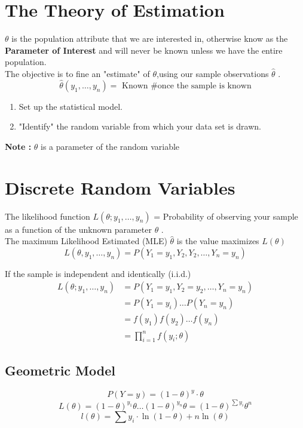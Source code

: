 \documentclass{article}
\begin{document}
\section{The Theory of Estimation}
\(\theta\) is the population attribute that we are interested in, otherwise know as the \textbf{Parameter of Interest} and will never be known unless we have the entire population.\\

The objective is to fine an "estimate" of \(\theta\),using our sample observations \(\hat{\theta}\) .
$$ \hat{\theta} (y_1, \ldots, y_n) = \text{ Known \# once the sample is known} $$ 

\begin{enumerate}
\item Set up the statistical model. 
\item "Identify" the random variable from which your data set is drawn. 
\end{enumerate} 

\textbf{Note : } \(\theta\) is a parameter of the random variable

\section{Discrete Random Variables}
The likelihood function \(L(\theta ; y_1, \ldots, y_n)\) = Probability of observing your sample as a function of the unknown parameter \(\theta\) . \\

The maximum Likelihood Estimated (MLE) \(\hat{\theta}\) is the value maximizes \(L(\theta)\)
$$ L(\theta, y_1, \ldots, y_n) = P(Y_1 = y_1, Y_2, Y_2, \ldots, Y_n = y_n)$$

If the sample is independent and identically  (i.i.d.) 
$$ \begin{aligned}
L(\theta; y_1, \ldots, y_n) & = P(Y_1 = y_1, Y_2 = y_2, \ldots, Y_n = y_n) \\
& = P(Y_1 = y_i) \ldots P(Y_n = y_n) \\
& = f(y_1)f(y_2)\ldots f(y_n) \\
& = \prod_{i=1}^{n}f(y_i ; \theta) 
\end{aligned} $$

\subsection*{Geometric Model}
$$P(Y = y) = (1 - \theta)^y  \cdot \theta $$
$$ L(\theta) = (1 - \theta)^{y_1} \theta \ldots (1 - \theta)^{y_n} \theta = (1-\theta)^{\sum y_i} \theta^n $$
$$ l(\theta) = \sum y_i \cdot \ln(1 - \theta) + n \ln (\theta) $$
\end{document}
